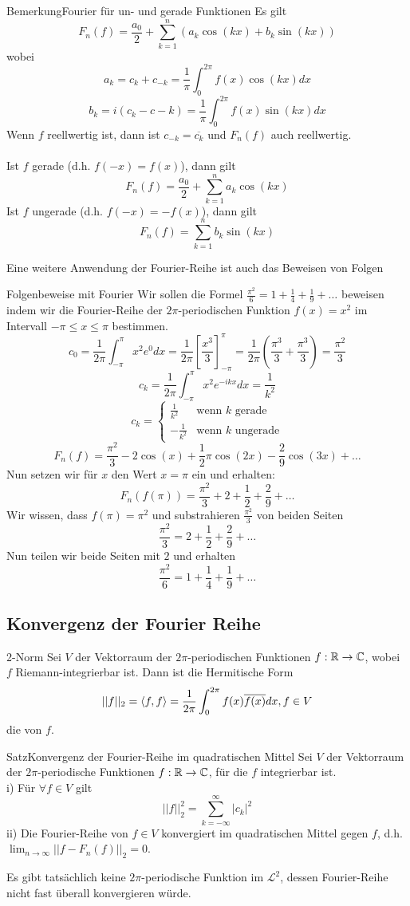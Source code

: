 \begin{Satz}{Bemerkung}{Fourier für un- und gerade Funktionen}
Es gilt $$F_n(f)=\frac{a_0}{2}+\sum_{k=1}^n (a_k\cos(kx)+b_k\sin(kx))$$
wobei $$a_k= c_k+c_{-k}=\frac{1}{\pi}\int_0^{2\pi}f(x)\cos(kx)dx$$
$$b_k=i(c_k-{c-k})=\frac{1}{\pi}\int_0^{2\pi}f(x)\sin(kx)dx$$
Wenn $f$ reellwertig ist, dann ist $c_{-k}=\overline{c_k}$ und $F_n(f)$ auch reellwertig. \\ \\
Ist $f$ gerade (d.h. $f(-x)=f(x)$), dann gilt
$$F_n(f)=\frac{a_0}{2}+\sum_{k=1}^n a_k\cos{(kx)}$$
Ist $f$ ungerade (d.h. $f(-x)=-f(x)$), dann gilt
$$F_n(f)=\sum_{k=1}^n b_k\sin{(kx)}$$
\end{Satz}
Eine weitere Anwendung der Fourier-Reihe ist auch das Beweisen von Folgen
\begin{Beispiel}{Folgenbeweise mit Fourier}
Wir sollen die Formel $\frac{\pi^2}{6}=1+\frac{1}{4}+\frac{1}{9}+\dots$ beweisen indem wir die Fourier-Reihe der $2\pi$-periodischen Funktion $f(x)=x^2$ im Intervall $-\pi\leq x\leq \pi$ bestimmen.
$$c_0=\frac{1}{2\pi}\int_{-\pi}^{\pi}x^2e^0dx=\frac{1}{2\pi}[\frac{x^3}{3}]_{-\pi}^{\pi}=\frac{1}{2\pi}(\frac{\pi^3}{3}+\frac{\pi^3}{3})=\frac{\pi^2}{3}$$
$$c_k=\frac{1}{2\pi}\int_{-\pi}^{\pi}x^2e^{-ikx}dx=\frac{1}{k^2}$$
$$c_k=\begin{cases} \frac{1}{k^2} & \mbox{wenn $k$ gerade} \\
-\frac{1}{k^2} & \mbox{wenn $k$ ungerade}
\end{cases}$$
$$F_n(f)=\frac{\pi^2}{3}-2\cos(x)+\frac{1}{2}\pi\cos(2x)-\frac{2}{9}\cos(3x)+\dots$$
Nun setzen wir für $x$ den Wert $x=\pi$ ein und erhalten:
$$F_n(f(\pi))=\frac{\pi^2}{3}+2+\frac{1}{2}+\frac{2}{9}+\dots$$
Wir wissen, dass $f(\pi)=\pi^2$ und substrahieren $\frac{\pi^2}{3}$ von beiden Seiten
$$\frac{\pi^2}{3}=2+\frac{1}{2}+\frac{2}{9}+\dots$$
Nun teilen wir beide Seiten mit $2$ und erhalten
$$\frac{\pi^2}{6}=1+\frac{1}{4}+\frac{1}{9}+\dots$$
\end{Beispiel}




\subsection{Konvergenz der Fourier Reihe}\label{ssec:FourierKonv}
\begin{Def}
{2-Norm}
Sei $V$ der Vektorraum der $2\pi$-periodischen Funktionen $f:\mathbb{R} \rightarrow \mathbb{C}$, wobei $f$ Riemann-integrierbar ist. Dann ist die Hermitische Form 
$$||f||_2=\langle f,f\rangle = \frac{1}{2\pi}\int_0^{2\pi}f(x)\overline{f(x)}dx, \space f\in V$$
die  von $f$.
\end{Def}
\begin{Satz}{Satz}{Konvergenz der Fourier-Reihe im quadratischen Mittel}
Sei $V$ der Vektorraum der $2\pi$-periodische Funktionen $f:\mathbb{R}\rightarrow\mathbb{C}$, für die $f$ integrierbar ist. \\
i) Für $\forall f\in V$ gilt
$$||f||_2^2=\sum_{k=-\infty}^\infty |c_k|^2$$
ii) Die Fourier-Reihe von $f\in V$ konvergiert im quadratischen Mittel gegen $f$, d.h. $\lim_{n\rightarrow \infty}||f-F_n(f)||_2=0$.
\end{Satz}
Es gibt tatsächlich keine $2\pi$-periodische Funktion im $\mathcal{L}^2$, dessen Fourier-Reihe nicht fast überall konvergieren würde.